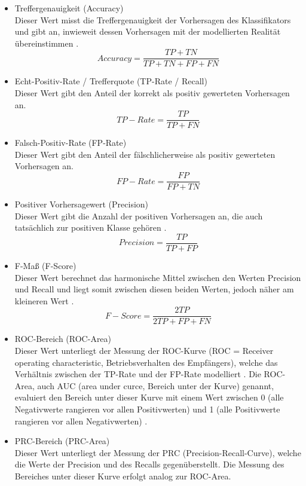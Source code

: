 \begin{itemize}
\item Treffergenauigkeit (Accuracy)
\\Dieser Wert misst die Treffergenauigkeit der Vorhersagen des Klassifikators und gibt an, inwieweit dessen Vorhersagen mit der modellierten Realität übereinstimmen \cite{Sammut2017}.
\\\[Accuracy = \frac{TP+TN}{TP+TN+FP+FN}\]
\item Echt-Positiv-Rate / Trefferquote (TP-Rate / Recall)
\\Dieser Wert gibt den Anteil der korrekt als positiv gewerteten Vorhersagen an. \cite{Alpaydin2010}
\\\[TP-Rate = \frac{TP}{TP+FN}\]
\item Falsch-Positiv-Rate (FP-Rate)
\\Dieser Wert gibt den Anteil der fälschlicherweise als positiv gewerteten Vorhersagen an. \cite{Alpaydin2010}
\\\[FP-Rate = \frac{FP}{FP+TN}\]
\item Positiver Vorhersagewert (Precision)
\\ Dieser Wert gibt die Anzahl der positiven Vorhersagen an, die auch tatsächlich zur positiven Klasse gehören \cite{Sammut2017}.
\\\[Precision = \frac{TP}{TP+FP}\]
\item F-Maß (F-Score)
\\ Dieser Wert berechnet das harmonische Mittel zwischen den Werten Precision und Recall und liegt somit zwischen diesen beiden Werten, jedoch näher am kleineren Wert \cite{Sammut2017}.
\\\[F-Score = \frac{2TP}{2TP+FP+FN}\]
\item ROC-Bereich (ROC-Area)
\\Dieser Wert unterliegt der Messung der ROC-Kurve (ROC =  Receiver operating characteristic, Betriebsverhalten des Empfängers), welche das Verhältnis zwischen der TP-Rate und der FP-Rate modelliert \cite{Sammut2017}. Die ROC-Area, auch AUC (area under curce, Bereich unter der Kurve) genannt, evaluiert den Bereich unter dieser Kurve mit einem Wert zwischen 0 (alle Negativwerte rangieren vor allen Positivwerten) und 1 (alle Positivwerte rangieren vor allen Negativwerten) \cite{Sammut2017}.
\item PRC-Bereich (PRC-Area)
\\Dieser Wert unterliegt der Messung der PRC (Precision-Recall-Curve), welche die Werte der Precision und des Recalls gegenüberstellt. Die Messung des Bereiches unter dieser Kurve erfolgt analog zur ROC-Area.
\end{itemize}

